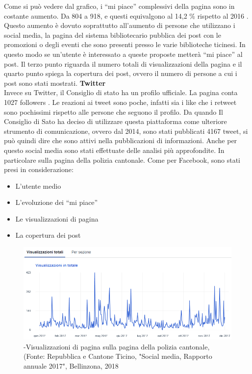 Come si può vedere dal grafico, i “mi piace” complessivi della pagina sono in costante aumento. Da 804 a 918, e questi equivalgono al 14,2 \% rispetto al 2016 . Questo aumento è dovuto soprattutto all’aumento di persone che utilizzano i social media, la pagina del sistema bibliotecario pubblica dei post con le promozioni o degli eventi che sono presenti presso le varie biblioteche ticinesi. In questo modo se un’utente è interessato a queste proposte metterà “mi piace” al post. Il terzo punto riguarda il numero totali di visualizzazioni della pagina e il quarto punto spiega la copertura dei post, ovvero il numero di persone a cui i post sono stati mostrati.
\newpage
\textbf {Twitter}\\
Invece su Twitter, il Consiglio di stato ha un profilo ufficiale. La pagina conta 1027 followers . Le reazioni ai tweet sono poche, infatti sia i like che i retweet sono pochissimi rispetto alle persone che seguono il profilo. Da quando Il Consiglio di Sato ha deciso di utilizzare questa piattaforma come ulteriore strumento di comunicazione, ovvero dal 2014, sono stati pubblicati 4167 tweet, si può quindi dire che sono attivi nella pubblicazioni di informazioni. Anche per questo social media sono stati effettuate delle analisi più approfondite. In particolare sulla pagina della polizia cantonale. Come per Facebook, sono stati presi in considerazione:
\begin{itemize}
    \item L’utente medio
    \item L’evoluzione dei “mi piace”
    \item Le visualizzazioni di pagina
    \item La copertura dei post
\end{itemize}
\begin{figure}[h]
    \includegraphics[width=\textwidth]{capitoli/foto/visualizzazioni.png}
    \caption{-Visualizzazioni di pagina sulla pagina della polizia cantonale, (Fonte: Repubblica e Cantone Ticino, "Social media, Rapporto annuale 2017", Bellinzona, 2018}
    \label{fig:my_label}
\end{figure}

